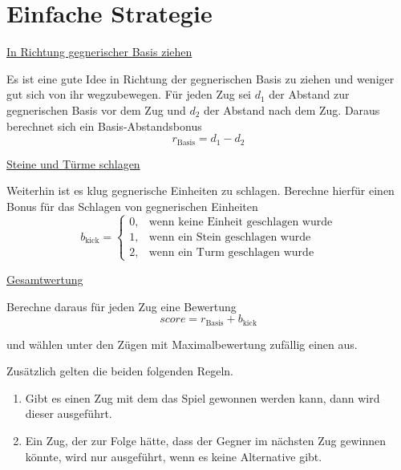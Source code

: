 \hypertarget{strategy}{\section*{Einfache Strategie}}
\underline{In Richtung gegnerischer Basis ziehen}

Es ist eine gute Idee in Richtung der gegnerischen Basis zu ziehen und weniger gut sich von ihr wegzubewegen. Für jeden Zug sei $d_1$ der Abstand zur gegnerischen Basis vor dem Zug und $d_2$ der Abstand nach dem Zug. Daraus berechnet sich ein Basis-Abstandsbonus \[r_\text{Basis} = d_1 - d_2\]

\underline{Steine und Türme schlagen}

Weiterhin ist es klug gegnerische Einheiten zu schlagen. Berechne hierfür einen Bonus für das Schlagen von gegnerischen Einheiten \[b_\text{kick} = \begin{cases}
0, & \text{wenn keine Einheit geschlagen wurde} \\
1, & \text{wenn ein Stein geschlagen wurde} \\
2, & \text{wenn ein Turm geschlagen wurde} %
\end{cases}\]

\underline{Gesamtwertung}

Berechne daraus für jeden Zug eine Bewertung
\[score = r_\text{Basis} + b_\text{kick}\]

und wählen unter den Zügen mit Maximalbewertung zufällig einen aus.

\bigskip

Zusätzlich gelten die beiden folgenden Regeln.
\begin{enumerate}[label=\alph*)]
\item Gibt es einen Zug mit dem das Spiel gewonnen werden kann, dann wird dieser ausgeführt.
\item Ein Zug, der zur Folge hätte, dass der Gegner im nächsten Zug gewinnen könnte, wird nur ausgeführt, wenn es keine Alternative gibt.
\end{enumerate}
